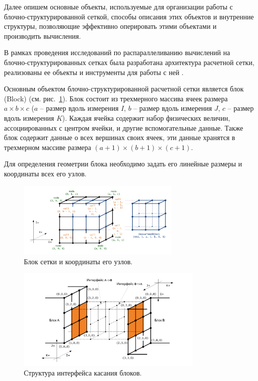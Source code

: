 Далее опишем основные объекты, используемые для организации работы с блочно-структурированной сеткой, способы описания этих объектов и внутренние структуры, позволяющие эффективно оперировать этими объектами и производить вычисления.

В рамках проведения исследований по распараллеливанию вычислений на блочно-структурированных сетках была разработана архитектура расчетной сетки, реализованы ее объекты и инструменты для работы с ней \cite{CertRybakov2020PrepStruct}.

Основным объектом блочно-структурированной расчетной сетки является блок (Block) (см. рис.~\ref{fig:text_2_block_block_and_coords}). 
Блок состоит из трехмерного массива ячеек размера $a \times b \times c$ ($a$ -- размер вдоль измерения $I$, $b$ -- размер вдоль измерения $J$, $c$ -- размер вдоль измерения $K$).
Каждая ячейка содержит набор физических величин, ассоциированных с центром ячейки, и другие вспомогательные данные.
Также блок содержит данные о всех вершинах своих ячеек, эти данные хранятся в трехмерном массиве размера $(a + 1) \times (b + 1) \times (c + 1)$.

Для определения геометрии блока необходимо задать его линейные размеры и координаты всех его узлов.

\begin{figure}[ht]
\centering
\includegraphics[width=0.7\textwidth]{fig/par_block_coords.pdf}
\singlespacing
{}\caption{Блок сетки и координаты его узлов.}
\label{fig:text_2_block_block_and_coords}
\end{figure}

\begin{figure}[ht]
\centering
\includegraphics[width=0.8\textwidth]{fig/par_7-iface.pdf}
\singlespacing
{}\caption{Структура интерфейса касания блоков.}
\label{fig:text_2_block_iface}
\end{figure}

